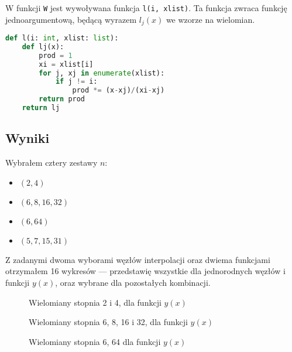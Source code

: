 \documentclass[a4paper,11pt]{article}
\begin{document}
W funkcji \lstinline{W} jest wywoływana funkcja \lstinline{l(i, xlist)}.
Ta funkcja zwraca funkcję jednoargumentową, będącą wyrazem \(l_j(x)\) we 
wzorze na wielomian.

\begin{lstlisting}[language=Python]
def l(i: int, xlist: list):
    def lj(x):
        prod = 1
        xi = xlist[i]
        for j, xj in enumerate(xlist):
            if j != i:
                prod *= (x-xj)/(xi-xj)
        return prod
    return lj
\end{lstlisting}

\subsection{Wyniki}
Wybrałem cztery zestawy \(n\):
\begin{itemize}
    \item \((2,4)\)
    \item \((6,8, 16, 32)\)
    \item \((6,64)\)
    \item \((5,7,15,31)\)
\end{itemize}
Z zadanymi dwoma wyborami węzłów interpolacji oraz dwiema funkcjami otrzymałem
16 wykresów --- przedstawię wszystkie dla jednorodnych węzłów i funkcji 
\(y(x)\), oraz wybrane dla pozostałych kombinacji.

\begin{figure}
    \begin{center}
                
    \end{center}
    \caption{Wielomiany stopnia 2 i 4, dla funkcji \(y(x)\)}
    \label{jedn_y_2,4}
\end{figure}

\begin{figure}
    \begin{center}
                
    \end{center}
    \caption{Wielomiany stopnia 6, 8, 16 i 32, dla funkcji \(y(x)\)}\label{jedn_y_6,8,16,32}
\end{figure}

\begin{figure}
    \begin{center}
                
    \end{center}
    \caption{Wielomiany stopnia 6, 64 dla funkcji \(y(x)\)}\label{jedn_y_6,64}
\end{figure}
\end{document}

